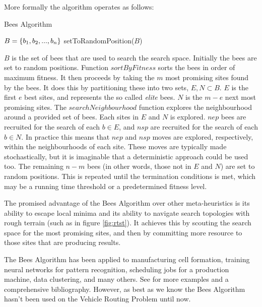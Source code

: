 More formally the algorithm operates as follows:

\begin{algorithm}[H]
   \caption{Bees Algorithm}
   $B = \{b_1, b_2,..., b_n\}$
   setToRandomPosition($B$)\\
\end{algorithm}

$B$ is the set of bees that are used to search the search space. Initially the bees are set to random positions. Function $sortByFitness$ sorts the bees in order of maximum fitness. It then proceeds by taking the $m$ most promising sites found by the bees. It does this by partitioning these into two sets, $E, N \subset B$. $E$ is the first $e$ best sites, and represents the so called \emph{elite} bees. $N$ is the $m - e$ next most promising sites. The $searchNeighbourhood$ function explores the neighbourhood around a provided set of bees. Each sites in $E$ and $N$ is explored. $nep$ bees are recruited for the search of each $b \in E$, and $nsp$ are recruited for the search of each $b \in N$. In practice this means that $nep$ and $nsp$ moves are explored, respectively, within the neighbourhoods of each site. These moves are typically made stochastically, but it is imaginable that a deterministic approach could be used too. The remaining $n - m$ bees (in other words, those not in $E$ and $N$) are set to random positions. This is repeated until the termination conditions is met, which may be a running time threshold or a predetermined fitness level. 

The promised advantage of the Bees Algorithm over other meta-heuristics is its ability to escape local minima and its ability to navigate search topologies with rough terrain (such as in figure \ref{fig:rtst}). It achieves this by scouting the search space for the most promising sites, and then by committing more resource to those sites that are producing results.


The Bees Algorithm has been applied to manufacturing cell formation, training neural networks for pattern recognition, scheduling jobs for a production machine, data clustering, and many others. See \cite{beesalg} for more examples and a comprehensive bibliography. However, as best as we know the Bees Algorithm hasn't been used on the Vehicle Routing Problem until now.

